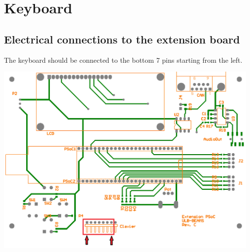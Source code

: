 \appendix

\section{Keyboard}

\subsection{Electrical connections to the extension board}
\label{ap:kb}

The keyboard should be connected to the bottom 7 pins starting from the left.
\begin{center}
    \includegraphics[width=13cm]{figures/keyboard_connection.png}
\end{center}
